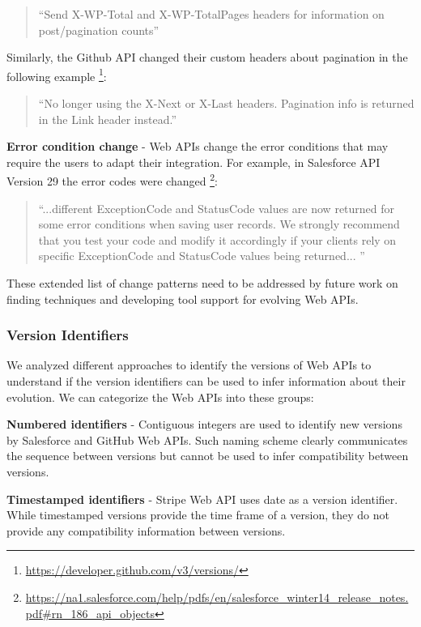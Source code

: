 \documentclass[conference]{IEEEtran}
\begin{document}
\small
\begin{quotation}
``Send X-WP-Total and X-WP-TotalPages headers for information on post/pagination counts''
\end{quotation}
\normalsize

Similarly, the Github API changed their custom headers about pagination in the following example \footnote{\url{https://developer.github.com/v3/versions/}}:

\small
\begin{quotation}
``No longer using the X-Next or X-Last headers. Pagination info is returned in the Link header instead.''
\end{quotation}
\normalsize

\textbf{Error condition change} - Web APIs change the error conditions that may require the users to adapt their integration. For example, in Salesforce API Version 29 the error codes were changed \footnote{\url{https://na1.salesforce.com/help/pdfs/en/salesforce_winter14_release_notes.pdf#rn_186_api_objects}}:

\small
\begin{quotation}
``...different ExceptionCode and StatusCode values are now returned for some error conditions
when saving user records. We strongly recommend that you test your code and modify it accordingly if your clients rely on specific ExceptionCode and StatusCode values being returned...
''\end{quotation}
\normalsize

These extended list of change patterns need to be addressed by future work on finding techniques and developing tool support for evolving Web APIs.

\subsubsection{Version Identifiers}

We analyzed different approaches to identify the versions of Web APIs to understand if the version identifiers can be used to infer information about their evolution. We can categorize the Web APIs into these groups:

\textbf{Numbered identifiers} - Contiguous integers are used to identify new versions by Salesforce and GitHub Web APIs. Such naming scheme clearly communicates the sequence between versions but cannot be used to infer compatibility between versions.

\textbf{Timestamped identifiers} - Stripe Web API uses date as a version identifier. While timestamped versions provide the time frame of a version, they do not provide any compatibility information between versions.
\end{document}
